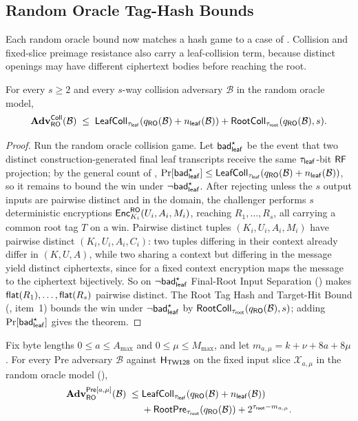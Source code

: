 \subsection{Random Oracle Tag-Hash Bounds}

Each random oracle bound now matches a hash game to a case of
. Collision and fixed-slice preimage resistance also
carry a leaf-collision term, because distinct openings may have different
ciphertext bodies before reaching the root.

\begin{theorem}
\label{thm:coll-ro}
For every $s \geq 2$ and every $s$-way collision
adversary $\mathcal{B}$ in the \TW{} random oracle model,
\[
  \mathbf{Adv}^{\mathsf{Coll}}_{\mathsf{RO}}(\mathcal{B})
  \;\leq\;
  \mathsf{LeafColl}_{\tau_{\mathsf{leaf}}}(q_{\mathsf{RO}}(\mathcal{B})+n_{\mathsf{leaf}}(\mathcal{B}))
  + \mathsf{RootColl}_{\tau_{\mathsf{root}}}(q_{\mathsf{RO}}(\mathcal{B}), s).
\]
\end{theorem}

\begin{proof}
Run the random oracle collision game. Let $\mathsf{bad}_{\mathsf{leaf}}^\star$ be the event
that two distinct construction-generated final leaf transcripts receive
the same $\tau_{\mathsf{leaf}}$-bit $\mathsf{RF}$ projection; by the general count
of ,
$\Pr[\mathsf{bad}_{\mathsf{leaf}}^\star] \leq \mathsf{LeafColl}_{\tau_{\mathsf{leaf}}}(q_{\mathsf{RO}}(\mathcal{B})+n_{\mathsf{leaf}}(\mathcal{B}))$,
so it remains to bound the win under $\neg\mathsf{bad}_{\mathsf{leaf}}^\star$. After rejecting
unless the $s$ output inputs are pairwise distinct and in the \TW{}
domain, the challenger performs $s$ deterministic encryptions
$\mathsf{Enc}_{K_i}^{\mathsf{RO}}(U_i, A_i, M_i)$, reaching $R_1,\dots,R_s$, all carrying a
common root tag $T$ on a win. Pairwise distinct tuples $(K_i, U_i, A_i, M_i)$
have pairwise distinct $(K_i, U_i, A_i, C_i)$: two tuples differing in their
context already differ in $(K, U, A)$, while two sharing a context but
differing in the message yield distinct ciphertexts, since for a fixed
context encryption maps the message to the ciphertext bijectively. So on
$\neg\mathsf{bad}_{\mathsf{leaf}}^\star$ Final-Root Input Separation
() makes $\mathsf{flat}(R_1),\dots,\mathsf{flat}(R_s)$
pairwise distinct. The Root Tag Hash and Target-Hit Bound (,
item~1) bounds the win under $\neg\mathsf{bad}_{\mathsf{leaf}}^\star$ by
$\mathsf{RootColl}_{\tau_{\mathsf{root}}}(q_{\mathsf{RO}}(\mathcal{B}),s)$; adding $\Pr[\mathsf{bad}_{\mathsf{leaf}}^\star]$
gives the theorem.
\end{proof}

\begin{theorem}
\label{thm:pre-ro}
Fix byte lengths $0 \leq a \leq A_{\max}$ and
$0 \leq \mu \leq M_{\max}$, and let
$m_{a,\mu}=k+\nu+8a+8\mu$. For every Pre adversary
$\mathcal{B}$ against $\mathsf{H}_{\mathsf{TW128}}$ on the fixed input slice
$\mathcal{X}_{a,\mu}$ in the \TW{} random oracle model
(),
\[
\begin{aligned}
  \mathbf{Adv}^{\mathsf{Pre}[a,\mu]}_{\mathsf{RO}}(\mathcal{B})
  \;\leq\;&
  \mathsf{LeafColl}_{\tau_{\mathsf{leaf}}}(q_{\mathsf{RO}}(\mathcal{B})+n_{\mathsf{leaf}}(\mathcal{B})) \\
  &+ \mathsf{RootPre}_{\tau_{\mathsf{root}}}(q_{\mathsf{RO}}(\mathcal{B}))
  + 2^{\tau_{\mathsf{root}}-m_{a,\mu}} .
\end{aligned}
\]
\end{theorem}

